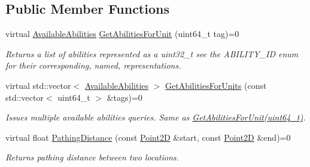 \subsection*{Public Member Functions}
\begin{DoxyCompactItemize}
\item 
\mbox{\label{classsc2_1_1_unit_query_interface_ac5a203b6d8e296f4f87aed41d2f88020}} 
virtual \hyperlink{structsc2_1_1_available_abilities}{Available\+Abilities} \hyperlink{classsc2_1_1_unit_query_interface_ac5a203b6d8e296f4f87aed41d2f88020}{Get\+Abilities\+For\+Unit} (uint64\+\_\+t tag)=0
\begin{DoxyCompactList}\small\item\em Returns a list of abilities represented as a uint32\+\_\+t see the A\+B\+I\+L\+I\+T\+Y\+\_\+\+ID enum for their corresponding, named, representations. \end{DoxyCompactList}\item 
\mbox{\label{classsc2_1_1_unit_query_interface_a10d42e1451047eee4d95943cb171dd7d}} 
virtual std\+::vector$<$ \hyperlink{structsc2_1_1_available_abilities}{Available\+Abilities} $>$ \hyperlink{classsc2_1_1_unit_query_interface_a10d42e1451047eee4d95943cb171dd7d}{Get\+Abilities\+For\+Units} (const std\+::vector$<$ uint64\+\_\+t $>$ \&tags)=0
\begin{DoxyCompactList}\small\item\em Issues multiple available abilities queries. Same as \hyperlink{classsc2_1_1_unit_query_interface_ac5a203b6d8e296f4f87aed41d2f88020}{Get\+Abilities\+For\+Unit(uint64\+\_\+t)}. \end{DoxyCompactList}\item 
\mbox{\label{classsc2_1_1_unit_query_interface_a5384551363a4f2e6432e2b2e5f76e954}} 
virtual float \hyperlink{classsc2_1_1_unit_query_interface_a5384551363a4f2e6432e2b2e5f76e954}{Pathing\+Distance} (const \hyperlink{structsc2_1_1_point2_d}{Point2D} \&start, const \hyperlink{structsc2_1_1_point2_d}{Point2D} \&end)=0
\begin{DoxyCompactList}\small\item\em Returns pathing distance between two locations. \end{DoxyCompactList}\item 
\mbox{\label{classsc2_1_1_unit_query_interface_a51f4e090257661d79381070f60b83af0}} 

\end{DoxyCompactItemize}
